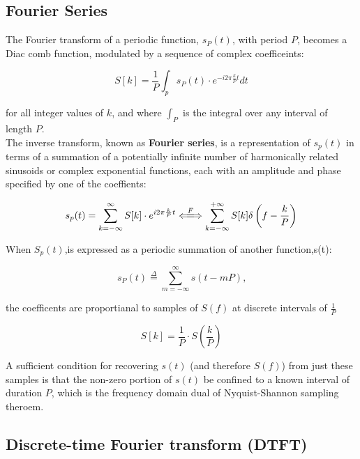 \documentclass{article}
\begin{document}
\subsection{Fourier Series}
The Fourier transform of a periodic function, $s_P(t)$, with period $P$, becomes a Diac comb function, modulated by a sequence of complex coefficeints:

\begin{equation*}
S[k]=\frac{1}{P}\int_{p}^{}{s_P(t) \cdot e^{-i2\pi \frac{k}{P}t}}dt
\end{equation*}

for all integer values of $k$, and where $\int_{P}$ is the integral over any interval of length $P$.\\
The inverse transform, known as \textbf{Fourier series}, is a representation of $s_p(t)$ in terms of a summation of a potentially infinite number of harmonically related sinusoids or complex exponential functions, each with an amplitude and phase specified by one of the coeffients:

\begin{equation*}
s_p(t)=\sum_{k=-\infty}^{\infty}{S[k] \cdot e^{i2\pi \frac{k}{P}t}} 
\xLongleftrightarrow[{}]{\text{$F$}}
\sum_{k=-\infty}^{+\infty}{S[k]\delta \left(f-\frac{k}{P}\right)}
\end{equation*}

When $S_p(t)$,is expressed as a periodic summation of another function,s(t):

\begin{equation*}
s_P(t)\overset{\Delta}{=}\sum_{m=-\infty}^{\infty}s(t-mP)\text{,}
\end{equation*}

the coefficents are proportianal to samples of $S(f)$ at discrete intervals of $\frac{1}{P}$

\begin{equation*}
S[k]=\frac{1}{P}\cdot S\left(\frac{k}{P}\right)
\end{equation*}

A sufficient condition for recovering $s(t)$ (and therefore $S(f)$) from just these samples is that the non-zero portion of $s(t)$ be confined to a known interval of duration $P$, which is the frequency domain dual of Nyquist-Shannon sampling theroem. 

\subsection{Discrete-time Fourier transform (DTFT)}
\end{document}
